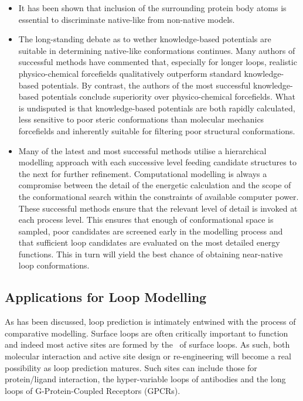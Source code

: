 \begin{itemize} \isep
\item 
It has been shown that inclusion of the surrounding protein body atoms is essential to discriminate native-like from non-native models\cite{METHOD:CLOOP}.
\item 
The long-standing debate as to wether knowledge-based potentials are suitable
in determining native-like conformations continues. Many authors of successful methods\cite{METHOD:Plop,METHOD:RapperA} have commented that, especially for longer loops, realistic physico-chemical forcefields qualitatively outperform standard knowledge-based potentials\cite{METHOD:Modloop}.
By contrast, the authors of the most successful knowledge-based potentials conclude
superiority over physico-chemical forcefields\cite{COMPCHEM:Zha2004}. What is undisputed is that knowledge-based
potentials are both rapidly calculated, less sensitive to poor
steric conformations than molecular mechanics forcefields and inherently suitable for filtering poor structural conformations.
\item
Many of the latest and most successful methods utilise a hierarchical modelling
approach with each successive level feeding candidate structures to the next
for further refinement\cite{METHOD:Plop,METHOD:RapperB}.
Computational modelling is always a compromise between the detail of the energetic calculation and the
scope of the conformational search within the constraints of available computer power. These  successful  methods ensure that the relevant level of detail is invoked at each process level. This ensures that enough of conformational space is sampled, poor candidates are screened early in the modelling process and that sufficient loop candidates are evaluated on the most detailed energy functions. This in turn will yield the best chance of obtaining near-native loop conformations.
\end{itemize}


\subsection{Applications for Loop Modelling}

As has been discussed, loop prediction is intimately entwined with the process
of comparative modelling. Surface loops are often critically  important to function and indeed most active sites are formed by the \sidechains\
of surface loops. As such, both molecular  interaction and active site design or re-engineering will become a real possibility
as loop prediction matures. Such sites can include those for protein/ligand interaction, the hyper-variable loops of antibodies\cite{METHOD:Antibody} and the long loops of G-Protein-Coupled Receptors (GPCRs)\cite{METHOD:AP:GPCR1,METHOD:AP:GPCR2}.






